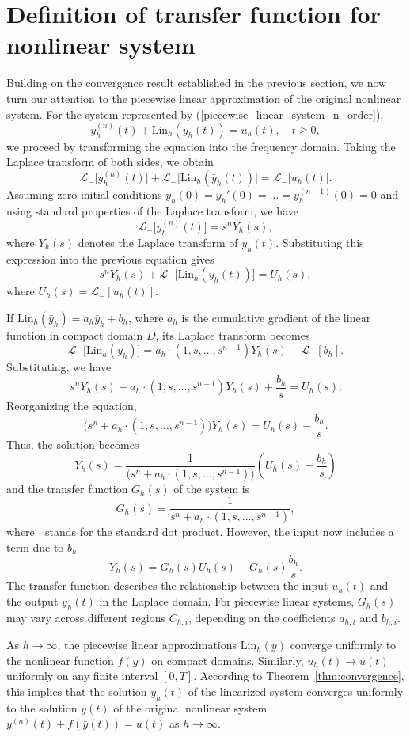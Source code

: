 \documentclass[preprint,12pt]{elsarticle}
\begin{document}
\section[]{Definition of transfer function for nonlinear system}
Building on the convergence result established in the previous section, 
we now turn our attention to the piecewise linear approximation of the original nonlinear system.
For the system represented by (\ref{piecewise_linear_system_n_order}),
\[
y_h^{(n)}(t) + \text{Lin}_h(\bar{y}_h(t)) = u_h(t), \quad t \ge 0,
\]
we proceed by transforming the equation into the frequency domain. 
Taking the Laplace transform of both sides, we obtain
\[
\mathcal{L}_-\!\big[y_h^{(n)}(t)\big] + \mathcal{L}_-\!\big[\text{Lin}_h(\bar{y}_h(t))\big] = \mathcal{L}_-\!\big[u_h(t)\big].
\]
Assuming zero initial conditions \( y_h(0) = y_h'(0) = \dots = y_h^{(n-1)}(0) = 0 \) and using standard properties of the Laplace transform, we have
\[
\mathcal{L}_-\!\big[y_h^{(n)}(t)\big] = s^n Y_h(s),
\]
where \( Y_h(s) \) denotes the Laplace transform of \( y_h(t) \). Substituting this expression into the previous equation gives
\[
s^n Y_h(s) + \mathcal{L}_-\!\big[\text{Lin}_h(\bar{y}_h(t))\big] = U_h(s),
\]
where \( U_h(s) = \mathcal{L}_-\![u_h(t)] \).


If \( \text{Lin}_h(\bar{y}_h) = a_h \bar{y}_h + b_h \), where \( a_h \) is the cumulative gradient of the linear function in compact domain $D$, its Laplace transform becomes
\[
\mathcal{L}_- \big[ \text{Lin}_h(\bar{y}_h) \big] = a_h \cdot (1,s,\dots,s^{n-1}) Y_h(s) + \mathcal{L}_-[b_h].
\]
Substituting, we have
\[
s^n Y_h(s) + a_h \cdot (1,s,\dots,s^{n-1}) Y_h(s) + \frac{b_h}{s} = U_h(s).
\]
Reorganizing the equation,
\[
\big(s^n  + a_h \cdot (1,s,\dots,s^{n-1}) \big) Y_h(s) = U_h(s) - \frac{b_h}{s}.
\]
Thus, the solution becomes
\[
Y_h(s) = \frac{1}{\big(s^n  + a_h \cdot (1,s,\dots,s^{n-1})\big)} \left(U_h(s) - \frac{b_h}{s}\right)
\]
and the transfer function \( G_h(s) \) of the system is 
\[
G_h(s) = \frac{1}{s^n  + a_h \cdot (1,s,\dots,s^{n-1})},
\]
where \(\cdot\) stands for the standard dot product. However, the input now includes a term due to \( b_h \)
\[
Y_h(s) = G_h(s) U_h(s) - G_h(s) \frac{b_h}{s}.
\]
The transfer function describes the relationship between the input \( u_h(t) \) and the output \( y_h(t) \) in the Laplace domain. For piecewise linear systems, \( G_h(s) \) may vary across different regions \( C_{h,i} \), depending on the coefficients \( a_{h,i} \) and \( b_{h,i} \).

As \( h \to \infty \), the piecewise linear approximations \( \mathrm{Lin}_h({y}) \) converge uniformly to the nonlinear function \( f(y) \) on compact domains. Similarly, \( u_h(t) \to u(t) \) uniformly on any finite interval \( [0, T] \). According to Theorem~\ref{thm:convergence}, this implies that the solution \( y_h(t) \) of the linearized system converges uniformly to the solution \( y(t) \) of the original nonlinear system \(y^{(n)}(t) + f(\bar{y}(t)) = u(t)\) as \( h \to \infty \).
\end{document}
